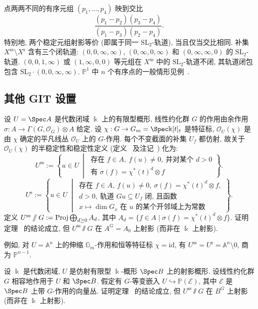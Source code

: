点两两不同的有序元组 $(p_1,\ldots,p_4)$ 映到交比
\[
\frac{(p_1-p_2)(p_3-p_4)}{(p_1-p_3)(p_2-p_4)}.
\]
特别地, 两个稳定元组射影等价 (即属于同一 $\mathrm{SL}_2$-轨道), 当且仅当交比相同. 补集 $X^{\mathrm{ss}}\setminus X^{\mathrm s}$ 含有三个闭轨道: $(0,0,\infty,\infty)$, $(0,\infty,0,\infty)$ 和 $(0,\infty,\infty,0)$ 的 $\mathrm{SL}_2$-轨道. $(0,0,1,\infty)$ 或 $(1,\infty,0,0)$ 等元组在 $X^{\mathrm{ss}}$ 中的 $\mathrm{SL}_2$-轨道不闭, 其轨道闭包包含 $\mathrm{SL}_2\cdot(0,0,\infty,\infty)$. $\mathbb P^1$ 中 $n$ 个有序点的一般情形见例~.
\subsection{其他 GIT 设置}\label{src:8.2.4-subsection}
\begin{exercise}\label{src:8.2.10}
设 $U=\Spec A$ 是代数闭域 $\Bbbk$ 上的有限型概形, 线性约化群 $G$ 的作用由余作用 $\sigma:A\to\Gamma(G,\mathcal O_G)\otimes A$ 给定. 设 $\chi:G\to\mathbb G_m=\Spec\Bbbk[t]_t$ 是特征标, $\mathcal O_U(\chi)$ 是由 $\chi$ 确定的平凡线丛 $\mathcal O_U$ 上的 $G$-作用. 每个不变截面的补集 $U_f$ 都仿射, 故关于 $\mathcal O_U(\chi)$ 的半稳定性和稳定性定义 (定义~ 及注记~) 化为:
\[
U^{\mathrm{ss}}:=\left\{u\in U\ \middle|\ \begin{array}{l}\text{存在 }f\in A,\ f(u)\ne0,\ \text{并对某个 }d>0\\\text{有 }\sigma(f)=\chi^*(t)^d\otimes f\end{array}\right\}.
\]
\[
U^{\mathrm s}:=\left\{u\in U\ \middle|\ \begin{array}{l}\text{存在 }f\in A,\ f(u)\ne0,\ \sigma(f)=\chi^*(t)^d\otimes f,\\d>0,\ \text{轨道 }Gu\subseteq U_f\text{ 闭, 且函数}\\x\mapsto\dim G_x\text{ 在 }u\text{ 的某个开邻域上为常数}\end{array}\right\}.
\]
定义 $U^{\mathrm{ss}}\mathbin{/\mkern-6mu/} G:=\operatorname{Proj}\bigoplus_{d\geq0}A_d$, 其中 $A_d=\{f\in A\mid\sigma(f)=\chi^*(t)^d\otimes f\}$. 证明定理~ 的结论成立, 但 $U^{\mathrm{ss}}\sslash G$ 在 $A^G=A_0$ 上射影 (而非在 $\Bbbk$ 上射影).

例如, 对 $U=\mathbb A^n$ 上的伸缩 $\mathbb G_m$-作用和恒等特征标 $\chi=\mathrm{id}$, 有 $U^{\mathrm{ss}}=U^{\mathrm s}=\mathbb A^n\setminus0$, 商为 $\mathbb P^{n-1}$.
\end{exercise}
\begin{exercise}\label{src:8.2.11}
设 $\Bbbk$ 是代数闭域, $U$ 是仿射有限型 $\Bbbk$-概形 $\Spec B$ 上的射影概形. 设线性约化群 $G$ 相容地作用于 $U$ 和 $\Spec B$. 假定有 $G$-等变嵌入 $U\hookrightarrow\mathbb P(\mathcal E)$, 其中 $\mathcal E$ 是 $\Spec B$ 上带 $G$-作用的向量丛. 证明定理~ 的结论成立, 但 $U^{\mathrm{ss}}\sslash G$ 在 $B^G$ 上射影 (而非在 $\Bbbk$ 上射影).
\end{exercise}
